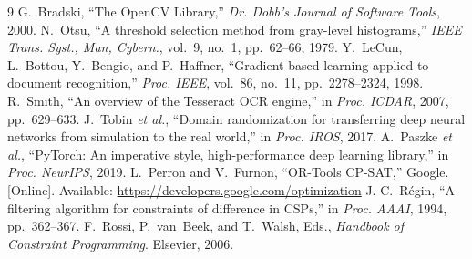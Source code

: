 \documentclass[conference,a4paper]{IEEEtran}
\begin{document}
\begin{thebibliography}{9}
 G.~Bradski, ``The OpenCV Library,'' \emph{Dr. Dobb's Journal of Software Tools}, 2000.
 N.~Otsu, ``A threshold selection method from gray-level histograms,'' \emph{IEEE Trans. Syst., Man, Cybern.}, vol.~9, no.~1, pp.~62--66, 1979.
 Y.~LeCun, L.~Bottou, Y.~Bengio, and P.~Haffner, ``Gradient-based learning applied to document recognition,'' \emph{Proc. IEEE}, vol.~86, no.~11, pp.~2278--2324, 1998.
 R.~Smith, ``An overview of the Tesseract OCR engine,'' in \emph{Proc. ICDAR}, 2007, pp.~629--633.
 J.~Tobin \emph{et al.}, ``Domain randomization for transferring deep neural networks from simulation to the real world,'' in \emph{Proc. IROS}, 2017.
 A.~Paszke \emph{et al.}, ``PyTorch: An imperative style, high-performance deep learning library,'' in \emph{Proc. NeurIPS}, 2019.
 L.~Perron and V.~Furnon, ``OR-Tools CP-SAT,'' Google. [Online]. Available: \url{https://developers.google.com/optimization}
 J.-C.~Régin, ``A filtering algorithm for constraints of difference in CSPs,'' in \emph{Proc. AAAI}, 1994, pp.~362--367.
 F.~Rossi, P.~van~Beek, and T.~Walsh, Eds., \emph{Handbook of Constraint Programming}. Elsevier, 2006.
\end{thebibliography}
\end{document}
